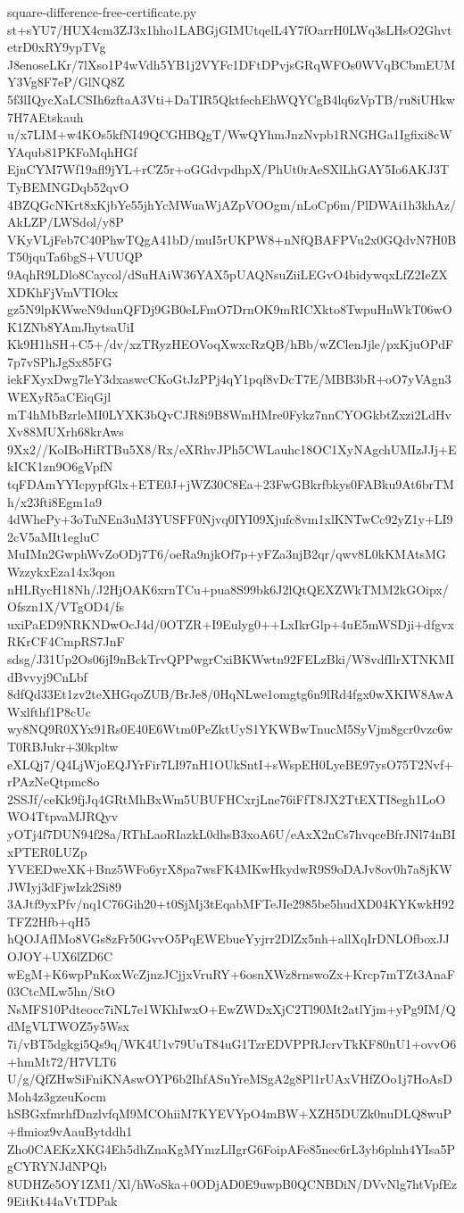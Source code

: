 \documentclass[11pt]{article}
\theoremstyle{definition}
\theoremstyle{remark}
\begin{document}
\begin{filecontents*}[overwrite]{square-difference-free-certificate.py}
st+sYU7/HUX4cm3ZJ3x1hho1LABGjGIMUtqelL4Y7fOarrH0LWq3sLHsO2GhvtetrD0xRY9ypTVg
J8enoseLKr/7lXso1P4wVdh5YB1j2VYFc1DFtDPvjsGRqWFOs0WVqBCbmEUMY3Vg8F7eP/GlNQ8Z
5f3lIQycXaLCSIh6zftaA3Vti+DaTIR5QktfechEhWQYCgB4lq6zVpTB/ru8iUHkw7H7AEtskauh
u/x7LIM+w4KOs5kfNI49QCGHBQgT/WwQYhmJnzNvpb1RNGHGa1Igfixi8cWYAqub81PKFoMqhHGf
EjnCYM7Wf19afl9jYL+rCZ5r+oGGdvpdhpX/PhUt0rAeSXlLhGAY5Io6AKJ3TTyBEMNGDqb52qvO
4BZQGcNKrt8xKjbYe55jhYcMWuaWjAZpVOOgm/nLoCp6m/PlDWAi1h3khAz/AkLZP/LWSdol/y8P
VKyVLjFeb7C40PhwTQgA41bD/muI5rUKPW8+nNfQBAFPVu2x0GQdvN7H0BT50jquTa6bgS+VUUQP
9AqhR9LDlo8Caycol/dSuHAiW36YAX5pUAQNsuZiiLEGvO4bidywqxLfZ2IeZXXDKhFjVmVTIOkx
gz5N9lpKWweN9dunQFDj9GB0eLFmO7DrnOK9mRICXkto8TwpuHnWkT06wOK1ZNb8YAmJhytsaUiI
Kk9H1hSH+C5+/dv/xzTRyzHEOVoqXwxcRzQB/hBb/wZClenJjle/pxKjuOPdF7p7vSPhJgSx85FG
iekFXyxDwg7leY3dxaswcCKoGtJzPPj4qY1pqf8vDcT7E/MBB3bR+oO7yVAgn3WEXyR5aCEiqGjl
mT4hMbBzrleMI0LYXK3bQvCJR8i9B8WmHMre0Fykz7nnCYOGkbtZxzi2LdHvXv88MUXrh68krAws
9Xx2//KoIBoHiRTBu5X8/Rx/eXRhvJPh5CWLauhc18OC1XyNAgchUMIzJJj+EkICK1zn9O6gVpfN
tqFDAmYYIcpypfGlx+ETE0J+jWZ30C8Ea+23FwGBkrfbkys0FABku9At6brTMh/x23fti8Egm1a9
4dWhePy+3oTuNEn3uM3YUSFF0Njvq0IYI09Xjufc8vm1xlKNTwCc92yZ1y+LI92cV5aMIt1egluC
MuIMn2GwphWvZoODj7T6/oeRa9njkOf7p+yFZa3njB2qr/qwv8L0kKMAtsMGWzzykxEza14x3qon
nHLRycH18Nh/J2HjOAK6xrnTCu+pua8S99bk6J2lQtQEXZWkTMM2kGOipx/Ofszn1X/VTgOD4/fs
uxiPaED9NRKNDwOcJ4d/0OTZR+I9Eulyg0++LxIkrGlp+4uE5mWSDji+dfgvxRKrCF4CmpRS7JnF
sdsg/J31Up2Os06jI9nBckTrvQPPwgrCxiBKWwtn92FELzBki/W8vdfIlrXTNKMIdBvvyj9CnLbf
8dfQd33Et1zv2teXHGqoZUB/BrJe8/0HqNLwe1omgtg6n9lRd4fgx0wXKIW8AwAWxlfthf1P8cUc
wy8NQ9R0XYx91Rs0E40E6Wtm0PeZktUyS1YKWBwTnucM5SyVjm8gcr0vzc6wT0RBJukr+30kpltw
eXLQj7/Q4LjWjoEQJYrFir7LI97nH1OUkSntI+sWspEH0LyeBE97ysO75T2Nvf+rPAzNeQtpmc8o
2SSJf/ceKk9fjJq4GRtMhBxWm5UBUFHCxrjLne76iFfT8JX2TtEXTI8egh1LoOWO4TtpvaMJRQyv
yOTj4f7DUN94f28a/RThLaoRIazkL0dhsB3xoA6U/eAxX2nCs7hvqceBfrJNl74nBIxPTER0LUZp
YVEEDweXK+Bnz5WFo6yrX8pa7wsFK4MKwHkydwR9S9oDAJv8ov0h7a8jKWJWIyj3dFjwIzk2Si89
3AJtf9yxPfv/nq1C76Gih20+t0SjMj3tEqabMFTeJIe2985be5hudXD04KYKwkH92TFZ2Hfb+qH5
hQOJAfIMo8VGs8zFr50GvvO5PqEWEbueYyjrr2DlZx5nh+allXqIrDNLOfboxJJOJOY+UX6lZD6C
wEgM+K6wpPnKoxWcZjnzJCjjxVruRY+6osnXWz8rnswoZx+Krcp7mTZt3AnaF03CtcMLw5hn/StO
NsMFS10Pdteocc7iNL7e1WKhIwxO+EwZWDxXjC2Tl90Mt2atlYjm+yPg9IM/QdMgVLTWOZ5y5Wsx
7i/vBT5dgkgi5Qs9q/WK4U1v79UuT84uG1TzrEDVPPRJcrvTkKF80nU1+ovvO6+hmMt72/H7VLT6
U/g/QfZHwSiFniKNAswOYP6b2IhfASuYreMSgA2g8Pl1rUAxVHfZOo1j7HoAsDMoh4z3gzeuKocm
hSBGxfmrhfDnzlvfqM9MCOhiiM7KYEVYpO4mBW+XZH5DUZk0nuDLQ8wuP+flmioz9vAauBytddh1
Zho0CAEKzXKG4Eh5dhZnaKgMYmzLlIgrG6FoipAFe85nec6rL3yb6plnh4YIsa5PgCYRYNJdNPQb
8UDHZe5OY1ZM1/Xl/hWoSka+0ODjAD0E9uwpB0QCNBDiN/DVvNlg7htVpfEz9EitKt44aVtTDPak

\end{filecontents*}
\end{document}
